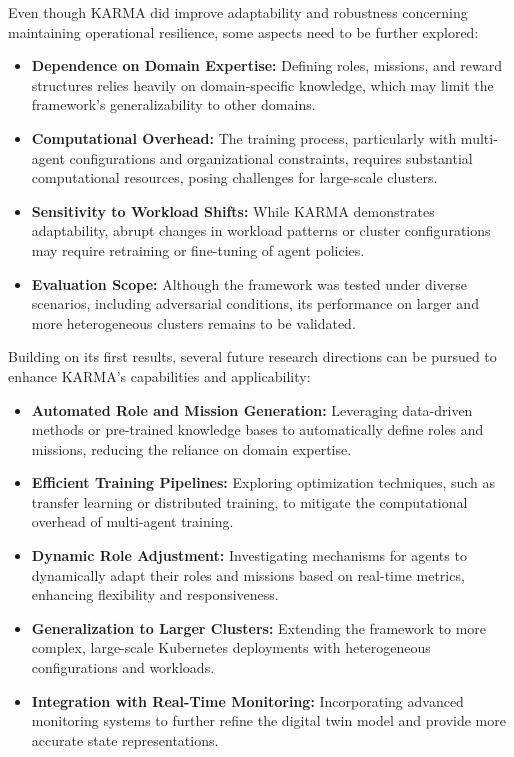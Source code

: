 \documentclass[conference]{IEEEtran}
\begin{document}
Even though KARMA did improve adaptability and robustness concerning maintaining operational resilience, some aspects need to be further explored:
\begin{itemize}
    \item \textbf{Dependence on Domain Expertise:} Defining roles, missions, and reward structures relies heavily on domain-specific knowledge, which may limit the framework's generalizability to other domains.
    \item \textbf{Computational Overhead:} The training process, particularly with multi-agent configurations and organizational constraints, requires substantial computational resources, posing challenges for large-scale clusters.
    \item \textbf{Sensitivity to Workload Shifts:} While KARMA demonstrates adaptability, abrupt changes in workload patterns or cluster configurations may require retraining or fine-tuning of agent policies.
    \item \textbf{Evaluation Scope:} Although the framework was tested under diverse scenarios, including adversarial conditions, its performance on larger and more heterogeneous clusters remains to be validated.
\end{itemize}

Building on its first results, several future research directions can be pursued to enhance KARMA's capabilities and applicability:
\begin{itemize}
    \item \textbf{Automated Role and Mission Generation:} Leveraging data-driven methods or pre-trained knowledge bases to automatically define roles and missions, reducing the reliance on domain expertise.
    \item \textbf{Efficient Training Pipelines:} Exploring optimization techniques, such as transfer learning or distributed training, to mitigate the computational overhead of multi-agent training.
    \item \textbf{Dynamic Role Adjustment:} Investigating mechanisms for agents to dynamically adapt their roles and missions based on real-time metrics, enhancing flexibility and responsiveness.
    \item \textbf{Generalization to Larger Clusters:} Extending the framework to more complex, large-scale Kubernetes deployments with heterogeneous configurations and workloads.
    \item \textbf{Integration with Real-Time Monitoring:} Incorporating advanced monitoring systems to further refine the digital twin model and provide more accurate state representations.
\end{itemize}
\end{document}
